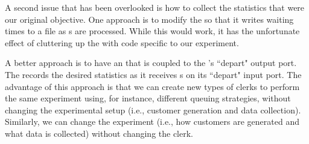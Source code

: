 A second issue that has been overlooked is how to collect the statistics that were our original objective. One approach is to modify the  so that it writes waiting times to a file as s are processed. While this would work, it has the unfortunate effect of cluttering up the  with code specific to our experiment.

A better approach is to have an  that is coupled to the 's ``depart" output port. The  records the desired statistics as it receives s on its ``depart" input port. The advantage of this approach is that we can create new types of clerks to perform the same experiment using, for instance, different queuing strategies, without changing the experimental setup (i.e., customer generation and data collection). Similarly, we can change the experiment (i.e., how customers are generated and what data is collected) without changing the clerk.

